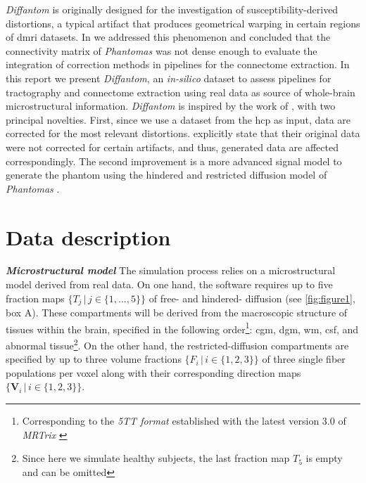 \documentclass[english]{frontiers/frontiersSCNS} %
\newcommand{\vmaps}{\ensuremath{\{\mathbf{V}_i \,|\, i \in \{1,2,3\}\}}}
\newcommand{\fmaps}{\ensuremath{\{F_i \,|\, i \in \{1,2,3\}\}}}
\newcommand{\tmaps}{\ensuremath{\{T_j \,|\, j \in \{1,\ldots,5\}\}}}
\begin{document}
\emph{Diffantom} is originally designed for the investigation of susceptibility-derived distortions, a
  typical artifact that produces geometrical warping in certain regions of \gls*{dmri} datasets.
In \citep{esteban_simulationbased_2014} we addressed this phenomenon and concluded that the connectivity
  matrix of \emph{Phantomas} was not dense enough to evaluate the integration of correction methods
  in pipelines for the connectome extraction.
In this report we present \emph{Diffantom}, an \emph{in-silico} dataset to assess pipelines for tractography
  and connectome extraction using real data as source of whole-brain microstructural information.
\emph{Diffantom} is inspired by the work of \cite{wilkins_fiber_2014}, with two principal novelties.
First, since we use a dataset from the \gls*{hcp} as input, data are corrected for the most relevant distortions.
\cite{wilkins_fiber_2014} explicitly state that their original data were not corrected for certain artifacts,
  and thus, generated data are affected correspondingly.
The second improvement is a more advanced signal model to generate the phantom using the hindered and restricted
  diffusion model of \emph{Phantomas} \citep{caruyer_phantomas_2014}.


\section*{Data description}

\noindent\textbf{\textit{Microstructural model\textcolon}\label{sec:data_model}} %
The simulation process relies on a microstructural model derived from real data.
On one hand, the software requires up to five fraction maps \tmaps{} of
  free- and hindered- diffusion (see \autoref{fig:figure1}, box A).
These compartments will be derived from the macroscopic structure of tissues within the brain,
  specified in the following order\footnote{Corresponding to the \emph{5TT format} established
  with the latest version 3.0 of \emph{MRTrix} \citep{tournier_mrtrix_2012}}:
  \gls*{cgm}, \gls*{dgm}, \gls*{wm}, \gls*{csf}, and abnormal tissue\footnote{Since here we
  simulate healthy subjects, the last fraction map $T_5$ is empty and can be omitted}.
On the other hand, the restricted-diffusion compartments are specified by up to three volume fractions \fmaps{}
  of three single fiber populations per voxel along with their corresponding direction maps \vmaps{}.
\end{document}
